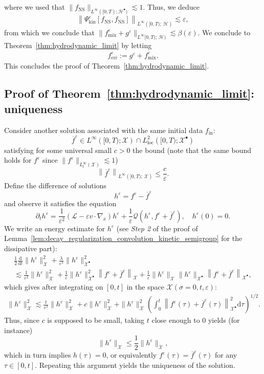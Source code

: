 \documentclass[AHL,Unicode,longabstracts,published]{cedram}
\newcommand{\ini}{\mathrm{in}}
\newcommand{\err}{\mathrm{err}}
\newcommand{\ns}{\mathrm{NS}}
\newcommand{\mix}{\mathrm{mix}}
\newcommand{\kin}{\mathrm{kin}}
\renewcommand{\d}{\mathrm{d}}
\newcommand{\XX}{\mathcal{X}}
\newcommand{\HH}{\mathcal{H}}
\newcommand{\LL}{\mathcal{L}}
\newcommand{\QQ}{\mathcal{Q}}
\newcommand{\GGG}{\mathscr{X}}
\newcommand{\SSs}{\HH}
\newcommand{\SSsp}{\HH^{\bullet}}
\newcommand{\SSl}{\XX}
\newcommand{\SSlp}{\XX^{\bullet}}
\newcommand{\SSSl}{\GGG}
\renewcommand*\le{\leqslant}
\newcommand*\eps{{\varepsilon}}
\begin{document}
where we used that $\| f_\ns \|_{ L^\infty([0, T) ; \SSsp ) } \lesssim 1$. Thus, we deduce
\[
\left\| \Psi^\eps_\kin[f_\ns, f_\ns] \right\|_{ L^\infty\left([0, T);\,\SSs \right) } \lesssim \eps,
\]
from which we conclude that $\| f^\eps_\mix + g^\eps \|_{ L^\infty[0, T);\,\SSs)} \lesssim \beta(\eps).$ We conclude to Theorem~\ref{thm:hydrodynamic_limit} by letting
\begin{gather*}
f^\eps_\err := g^\eps + f^\eps_\mix.
\end{gather*}
This concludes the proof of Theorem~\ref{thm:hydrodynamic_limit}.

\subsection{Proof of Theorem~\ref{thm:hydrodynamic_limit}: uniqueness}\label{scn:uniqueness_simmetrizable}

Consider another solution associated with the same initial data $f_\ini$:
\[
\overline{f}^\eps \in L^\infty\left([0, T) ; \SSl \right) \cap L^2_{\text{loc}}\left([0, T) ; \SSlp \right)
\]
satisfying for some universal small $c > 0$ the bound (note that the same bound holds for $f^\eps$ since $\| f^\eps \|_{L^\infty_t (\SSl)} \lesssim 1$)
\[
\left\| \overline{f}^\eps\right\|_{ L^\infty \left([0, T) ;\,\SSl \right) } \le \frac{c}{\eps}.
\]
Define the difference of solutions
\[
h^\eps = f^\eps - \overline{f}^\eps
\]
and observe it satisfies the equation
\[
\partial_t h^\eps = \frac{1}{\eps^2} \left(\LL - \eps v \cdot \nabla_x \right) h^\eps + \frac{1}{\eps} \QQ \left(h^\eps, f^\eps + \overline{f}^\eps \right), \quad h^\eps(0) = 0.
\]
We write an energy estimate for $h^\eps$ (see \emph{Step 2} of the proof of Lemma~\ref{lem:decay_regularization_convolution_kinetic_semigroup} for the dissipative part):
\begin{multline*}
\frac{1}{2} \frac{\d}{\d t} \| h^\eps \|^2_{ \SSl } + \frac{\lambda}{\eps^2} \| h^\eps \|^2_{ \SSlp }\\ \lesssim \frac{1}{\eps^2} \| h^\eps \|^2_{ \SSl } + \frac{1}{\eps} \| h^\eps \|_{ \SSlp }^2 \left\| f^\eps + \overline{f}^\eps \right\|_{ \SSl } + \frac{1}{\eps} \| h^\eps \|_{ \SSl } \| h^\eps \|_{ \SSlp } \left\| f^\eps + \overline{f}^\eps \right\|_{ \SSlp },
\end{multline*}
which gives after integrating on $[0, t]$ in the space $\SSSl(\sigma=0, t, \eps)$:
\begin{align*}
\| h^\eps \|_{ \SSSl }^2 \lesssim \frac{t}{\eps^2} \| h^\eps \|_{ \SSSl }^2 + c \| h^\eps \|_{ \SSSl }^2 + \| h^\eps \|_{ \SSSl }^2 \left(\int_0^t \left\| f^\eps(\tau) + \overline{f}^\eps(\tau) \right\|^2_{\SSlp} \d \tau\right)^{1/2}.
\end{align*}
Thus, since $c$ is supposed to be small, taking $t$ close enough to $0$ yields (for instance)
\[
\| h^\eps \|_{ \SSSl } \le \frac{1}{2} \| h^\eps \|_{ \SSSl },
\]
which in turn implies $h(\tau) = 0$, or equivalently $f^\eps(\tau) = \overline{f}^\eps(\tau)$ for any $\tau \in [0, t]$. Repeating this argument yields the uniqueness of the solution.
\end{document}
